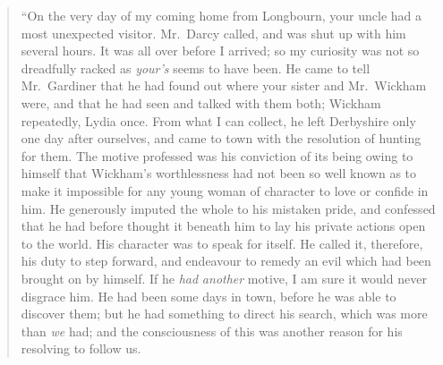 \documentclass[12pt,english]{book}
\begin{document}
\begin{quotation}
{}``On the very day of my coming home from Longbourn, your uncle
had a most unexpected visitor. Mr.\ Darcy called, and was shut up
with him several hours. It was all over before I arrived; so my curiosity
was not so dreadfully racked as \textit{your's} seems to have been.
He came to tell Mr.\ Gardiner that he had found out where your sister
and Mr.\ Wickham were, and that he had seen and talked with them
both; Wickham repeatedly, Lydia once. From what I can collect, he
left Derbyshire only one day after ourselves, and came to town with
the resolution of hunting for them. The motive professed was his conviction
of its being owing to himself that Wickham's worthlessness had not
been so well known as to make it impossible for any young woman of
character to love or confide in him. He generously imputed the whole
to his mistaken pride, and confessed that he had before thought it
beneath him to lay his private actions open to the world. His character
was to speak for itself. He called it, therefore, his duty to step
forward, and endeavour to remedy an evil which had been brought on
by himself. If he \textit{had} \textit{another} motive, I am sure
it would never disgrace him. He had been some days in town, before
he was able to discover them; but he had something to direct his search,
which was more than \textit{we} had; and the consciousness of this
was another reason for his resolving to follow us.


\end{quotation}
\end{document}
